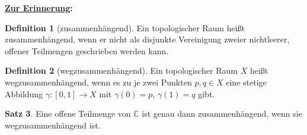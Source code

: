 \documentclass[11pt,titlepage]{article}
\theoremstyle{definition}
\newtheorem{theorem}{Satz}[section]
\newtheorem{definition}[theorem]{Definition}
\theoremstyle{remark}
\begin{document}
	\textbf{\underline{Zur Erinnerung}:}
	
	\begin{definition}[zusammenhängend]
		Ein topologischer Raum heißt zusammenhängend, wenn er nicht als disjunkte Vereinigung zweier 
		nichtleerer, offener Teilmengen geschrieben werden kann.
	\end{definition}
	
	\begin{definition}[wegzusammenhängend]
		Ein topologischer Raum $X$ heißt wegzusammenhängend, wenn es zu je zwei Punkten 
		$p,q\in X$ eine stetige Abbildung $\gamma :[0,1]\to X$ mit $\gamma (0)=p$, $\gamma (1)=q$ 
		gibt.
	\end{definition}
	
	\begin{theorem}
		Eine offene Teilmenge von $\mathbb{C}$ ist genau dann zusammenhängend, wenn sie 
		wegzusammenhängend ist.
	\end{theorem}
\end{document}
